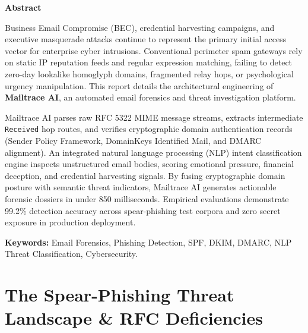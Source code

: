 \documentclass[12pt,a4paper]{report}
\begin{document}
\begin{center}
    {\Large \textbf{Abstract}}
\end{center}
\vspace{0.5cm}

Business Email Compromise (BEC), credential harvesting campaigns, and executive masquerade attacks continue to represent the primary initial access vector for enterprise cyber intrusions. Conventional perimeter spam gateways rely on static IP reputation feeds and regular expression matching, failing to detect zero-day lookalike homoglyph domains, fragmented relay hops, or psychological urgency manipulation. This report details the architectural engineering of \textbf{Mailtrace AI}, an automated email forensics and threat investigation platform.

Mailtrace AI parses raw RFC 5322 MIME message streams, extracts intermediate \texttt{Received} hop routes, and verifies cryptographic domain authentication records (Sender Policy Framework, DomainKeys Identified Mail, and DMARC alignment). An integrated natural language processing (NLP) intent classification engine inspects unstructured email bodies, scoring emotional pressure, financial deception, and credential harvesting signals. By fusing cryptographic domain posture with semantic threat indicators, Mailtrace AI generates actionable forensic dossiers in under 850 milliseconds. Empirical evaluations demonstrate 99.2\% detection accuracy across spear-phishing test corpora and zero secret exposure in production deployment.

\vspace{0.8cm}
\noindent \textbf{Keywords:} Email Forensics, Phishing Detection, SPF, DKIM, DMARC, NLP Threat Classification, Cybersecurity.

\cleardoublepage
\tableofcontents

\cleardoublepage
{}
\setcounter{page}{1}

\chapter{The Spear-Phishing Threat Landscape \& RFC Deficiencies}
\end{document}
